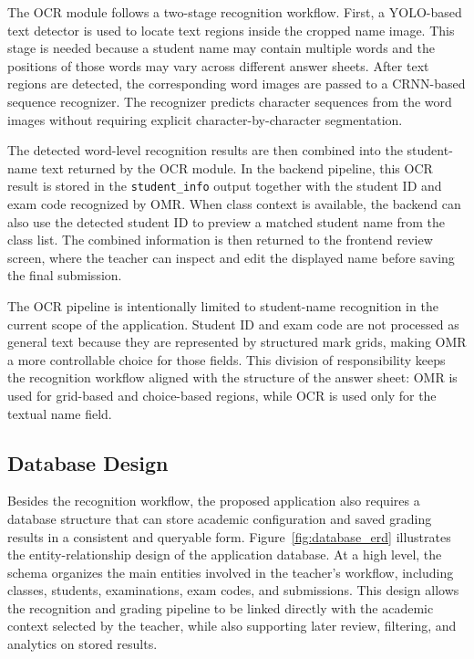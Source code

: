 \documentclass[../Main.tex]{subfiles}
\begin{document}
The OCR module follows a two-stage recognition workflow. First, a YOLO-based
text detector is used to locate text regions inside the cropped name image. This
stage is needed because a student name may contain multiple words and the
positions of those words may vary across different answer sheets. After text
regions are detected, the corresponding word images are passed to a CRNN-based
sequence recognizer. The recognizer predicts character sequences from the word
images without requiring explicit character-by-character segmentation.

The detected word-level recognition results are then combined into the
student-name text returned by the OCR module. In the backend pipeline, this OCR
result is stored in the \texttt{student\_info} output together with the student
ID and exam code recognized by OMR. When class context is available, the backend
can also use the detected student ID to preview a matched student name from the
class list. The combined information is then returned to the frontend review
screen, where the teacher can inspect and edit the displayed name before saving
the final submission.

The OCR pipeline is intentionally limited to student-name recognition in the
current scope of the application. Student ID and exam code are not processed as
general text because they are represented by structured mark grids, making OMR a
more controllable choice for those fields. This division of responsibility keeps
the recognition workflow aligned with the structure of the answer sheet: OMR is
used for grid-based and choice-based regions, while OCR is used only for the
textual name field.

\subsection{Database Design}
\label{subsection:4.1.4}

Besides the recognition workflow, the proposed application also requires a
database structure that can store academic configuration and saved grading
results in a consistent and queryable form. Figure~\ref{fig:database_erd}
illustrates the entity-relationship design of the application database. At a
high level, the schema organizes the main entities involved in the teacher's
workflow, including classes, students, examinations, exam codes, and
submissions. This design allows the recognition and grading pipeline to be
linked directly with the academic context selected by the teacher, while also
supporting later review, filtering, and analytics on stored results.
\end{document}
